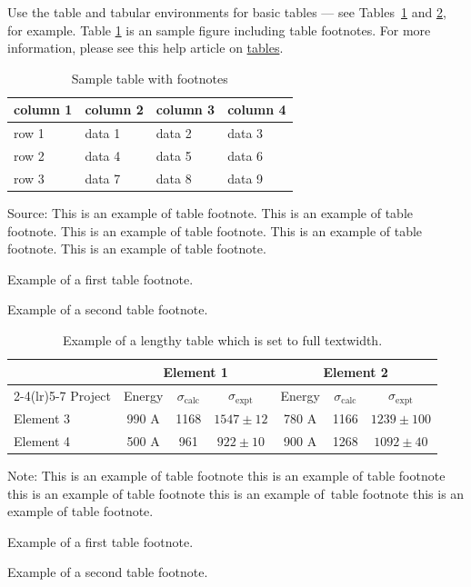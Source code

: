 \documentclass[12pt,a4paper]{article}
\begin{document}
Use the table and tabular environments for basic tables --- see Tables~\ref{tab1} and \ref{tab2}, for example. Table \ref{tab1} is an sample figure including table footnotes. For more information, please see this help article on \href{https://www.overleaf.com/learn/latex/tables}{tables}. 

\begin{table}[!ht]
\caption{Sample table with footnotes\label{tab1}}
\begin{threeparttable}
\begin{tabular*}{\columnwidth}{@{\extracolsep\fill}llll@{\extracolsep\fill}}
\toprule
column 1 & column 2 & column 3 & column 4\\
\midrule
row 1 & data 1 & data 2 & data 3 \\
row 2 & data 4 & data 5\tnote{1} & data 6 \\
row 3 & data 7 & data 8 & data 9\tnote{2} \\
\bottomrule
\end{tabular*}
\begin{tablenotes}
\item Source: This is an example of table footnote. This is an example of table footnote. This is an example of table footnote. This is an example of table footnote. This is an example of table footnote.
\item[1] Example of a first table footnote.
\item[2] Example of a second table footnote.
\end{tablenotes}
\end{threeparttable}
\end{table}

\begin{table}[!ht]
\caption{Example of a lengthy table which is set to full textwidth.\label{tab2}}
\tabcolsep=0pt
\begin{threeparttable}
\begin{tabular*}{\textwidth}{@{\extracolsep{\fill}}lcccccc@{\extracolsep{\fill}}}
\toprule
& \multicolumn{3}{c}{Element 1\tnote{1}} & \multicolumn{3}{c}{Element 2\tnote{2}} \\
\cmidrule(lr){2-4}\cmidrule(lr){5-7}
Project & Energy & $\sigma_{\mathrm{calc}}$ & $\sigma_{\mathrm{expt}}$ & Energy & $\sigma_{\mathrm{calc}}$ & $\sigma_{\mathrm{expt}}$ \\
\midrule
Element 3 & 990 A & 1168 & $1547\pm12$ & 780 A & 1166 & $1239\pm100$ \\
Element 4 & 500 A & 961 & $922\pm10$ & 900 A & 1268 & $1092\pm40$ \\
\bottomrule
\end{tabular*}
\begin{tablenotes}
\item Note: This is an example of table footnote this is an example of table footnote this is an example of table footnote this is an example of~table footnote this is an example of table footnote.
\item[1] Example of a first table footnote.
\item[2] Example of a second table footnote.
\end{tablenotes}
\end{threeparttable}
\end{table}
\end{document}
